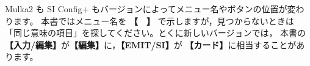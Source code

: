 \documentclass[a4paper,10pt,openany]{ltjsbook}
\begin{document}
\vspace{8pt}
\begin{Note}[画面の表記について]
Mulka2 も SI Config+ もバージョンによってメニュー名やボタンの位置が変わります。
本書ではメニュー名を \textbf{【　】} で示しますが，見つからないときは
「同じ意味の項目」を探してください。とくに新しいバージョンでは，
本書の \textbf{【入力/編集】}が\textbf{【編集】}に，\textbf{【EMIT/SI】}が
\textbf{【カード】}に相当することがあります。
\end{Note}

\tableofcontents



\mainmatter
\setcounter{chapter}{-1}










\end{document}
